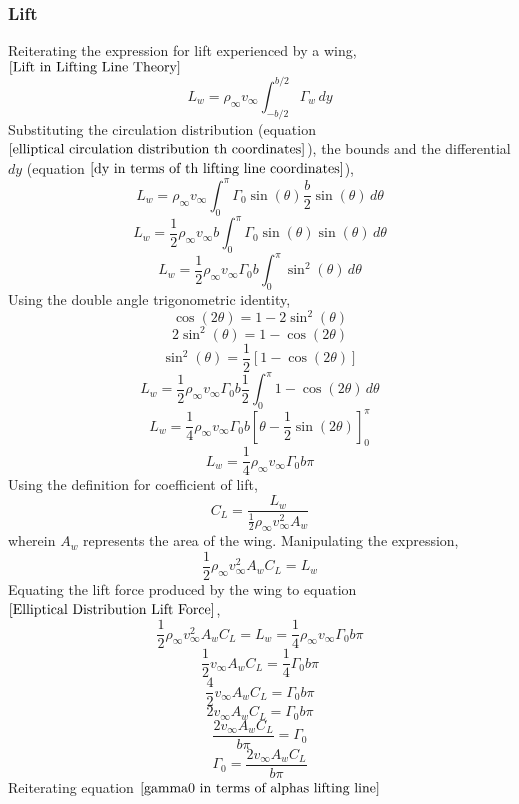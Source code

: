 \documentclass[a4paper, 12pt]{report}
\begin{document}
\begin{center}
\subsubsection{Lift}
\begin{comment}
\end{comment}
Reiterating the expression for lift experienced by a wing, $\ref{Lift in Lifting Line Theory}$
$$L_{w} = \rho_{\infty}v_{\infty}\int^{b/2}_{-b/2}\Gamma_{w}\,dy$$
Substituting the circulation distribution (equation $\ref{elliptical circulation distribution th coordinates}$), the bounds and the differential $dy$ (equation $\ref{dy in terms of th lifting line coordinates}$),
$$L_{w} = \rho_{\infty}v_{\infty}\int^{\pi}_{0} \Gamma_{0}\sin(\theta) \frac{b}{2}\sin(\theta)\,d\theta$$
$$L_{w} = \frac{1}{2}\rho_{\infty}v_{\infty}b \int^{\pi}_{0} \Gamma_{0}\sin(\theta) \sin(\theta)\,d\theta$$
$$L_{w} = \frac{1}{2}\rho_{\infty}v_{\infty}\Gamma_{0}b \int^{\pi}_{0} \sin^{2}(\theta) \,d\theta$$
Using the double angle trigonometric identity,
$$\cos(2\theta) = 1 - 2\sin^{2}(\theta)$$
$$2\sin^{2}(\theta) = 1 - \cos(2\theta)$$
$$\sin^{2}(\theta) = \frac{1}{2}\left[1 - \cos(2\theta)\right]$$
$$L_{w} = \frac{1}{2}\rho_{\infty}v_{\infty}\Gamma_{0}b \frac{1}{2}\int^{\pi}_{0}  1 - \cos(2\theta)  \,d\theta$$
$$L_{w} = \frac{1}{4}\rho_{\infty}v_{\infty}\Gamma_{0}b \left[\theta - \frac{1}{2}\sin(2\theta)\right]^{\pi}_{0} $$
\begin{equation}
L_{w} = \frac{1}{4}\rho_{\infty}v_{\infty}\Gamma_{0}b\pi
\label{Elliptical Distribution Lift Force}
\end{equation}
Using the definition for coefficient of lift,
$$C_{L} = \frac{L_{w}}{\displaystyle \frac{1}{2}\rho_{\infty}v_{\infty}^{2}A_{w}}$$
wherein $A_{w}$ represents the area of the wing. Manipulating the expression,
$$\frac{1}{2}\rho_{\infty}v_{\infty}^{2}A_{w} C_{L} = L_{w}$$
Equating the lift force produced by the wing to equation $\ref{Elliptical Distribution Lift Force}$,
$$\frac{1}{2}\rho_{\infty}v_{\infty}^{2}A_{w} C_{L} = L_{w} = \frac{1}{4}\rho_{\infty}v_{\infty}\Gamma_{0}b\pi$$
$$\frac{1}{2}v_{\infty}A_{w} C_{L} = \frac{1}{4}\Gamma_{0}b\pi$$
$$\frac{4}{2}v_{\infty}A_{w} C_{L} = \Gamma_{0}b\pi$$
$$2 v_{\infty}A_{w} C_{L} = \Gamma_{0}b\pi$$
$$\frac{2 v_{\infty}A_{w} C_{L}}{b\pi} = \Gamma_{0}$$
\begin{equation}
\Gamma_{0} = \frac{2 v_{\infty}A_{w} C_{L}}{b\pi}
\label{Maximum Vortex Distribution in terms of CL Lifting Line}
\end{equation}
Reiterating equation $\ref{gamma0 in terms of alphas lifting line}$

\end{center}
\end{document}
